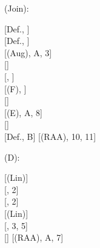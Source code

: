 \documentclass[a4paper,english,fleqn,11pt,final]{scrartcl}
\newcommand{\logicOpFont}[1]{\mathsf{#1}}
\newcommand{\negg}{{\sim}}
\newcommand{\E}{\protect\ensuremath\logicOpFont{E}}
\newcommand{\timp}{\rightarrowtriangle}
\newcommand{\Deriv}[1]{{\normalfont\textsf{#1}}}
\newcommand{\oland}{\owedge}
\theoremstyle{plain}
\theoremstyle{definition}
\begin{document}
{\begin{minipage}[t][][b]{.46\textwidth}
\Deriv{(Join)}:

\medskip

{
\setlength{\fitchprfwidth}{1.58in}
\fitchprf{
\pline[A ]{\Diamond\alpha}\\
\pline[B ]{\Diamond\E\alpha}
}
{
\subproof{\pline[1 ]{\negg\Diamond(\alpha \oland \E\alpha)}}
{
	\pline[2 ]{\triangle\negg(\alpha \oland \E\alpha)}[Def., ]\\
	\pline[3 ]{\triangle(\alpha \timp \neg\alpha)}[Def., ]\\
	\pline[4 ]{\Diamond(\alpha \oland (\alpha \timp \neg\alpha))}[\Deriv{(Aug)}, A, 3]\\
	\pline[5 ]{\Diamond(\alpha \oland \neg\alpha)}[]\\
	\pline[6 ]{\Diamond\bot}[, ]\\
	\pline[7 ]{\bot}[\Deriv{(F)}, ]\\
	\pline[8 ]{\Box\neg\alpha}[]\\
	\pline[9 ]{\triangle\neg\alpha}[\Deriv{(E)}, A, 8]\\
	\pline[10]{\triangle\negg\negg\neg\alpha}[]\\
	\pline[11]{\negg\triangle\negg\negg\neg\alpha}[Def., B]
}
	\pline[\slider]{\Diamond(\alpha\oland\E\alpha)}[\Deriv{(RAA)}, 10, 11]
}
}
\end{minipage}







\bigskip








\begin{minipage}[t][][b]{.43\textwidth}

\Deriv{(D)}:

\medskip

{
\setlength{\fitchprfwidth}{1.2in}
\fitchprf{
\pline[A ]{\Box\varphi \timp \Box \psi}
}
{
\subproof{\pline[1 ]{\negg\Box(\varphi\timp\psi)}}
{
	\pline[2 ]{\Box\negg(\varphi \timp \psi)}[\Deriv{(Lin)}]\\
	\pline[3 ]{\Box\varphi}[, 2]\\
	\pline[4 ]{\Box\negg\psi}[, 2]\\
	\pline[5 ]{\negg\Box\psi}[\Deriv{(Lin)}]\\
	\pline[6 ]{\Box \varphi \oland \negg \Box\psi}[, 3, 5]\\
	\pline[7 ]{\negg(\Box \varphi \timp \Box\psi)}[]
}
	\pline[\slider]{\Box(\varphi\timp\psi)}[\Deriv{(RAA)}, A, 7]
}
}
\end{minipage}
\begin{minipage}[t][][b]{.46\textwidth}


\end{minipage}}
\end{document}
